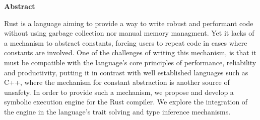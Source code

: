
\clearemptydoublepage
{}
{}

\vspace*{2cm}
\begin{center}
{\Large \textbf{Abstract}}
\end{center}
\vspace{1cm}

Rust is a language aiming to provide a way to write robust and performant code without using garbage collection nor manual memory managment. Yet it lacks of a mechanism to abstract constants, forcing users to repeat code in cases where constants are involved. One of the challenges of writing this mechanism, is that it must be compatible with the language's core principles of performance, reliability and productivity, putting it in contrast with well established languages such as C++, where the mechanism for constant abstraction is another source of unsafety. In order to provide such a mechanism, we propose and develop a symbolic execution engine for the Rust compiler. We explore the integration of the engine in the language's trait solving and type inference mechanisms.

